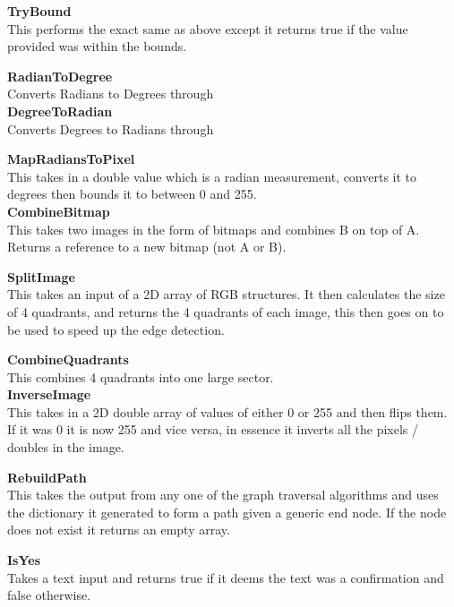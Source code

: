 \begin{FlushLeft}
    \textbf{TryBound} \\ \bk
    This performs the exact same as above except it returns true if the value provided was within the bounds.\\\bk

    \textbf{RadianToDegree} \\ \bk
    Converts Radians to Degrees through \\\bk
    \textbf{DegreeToRadian} \\ \bk
    Converts Degrees to Radians through \\\bk

    \textbf{MapRadiansToPixel} \\ \bk
    This takes in a double value which is a radian measurement, converts it to degrees then bounds it to between 0 and 255.\\\bk
    \textbf{CombineBitmap} \\ \bk
    This takes two images in the form of bitmaps and combines B on top of A. Returns a reference to a new bitmap (not A or B).\\\bk

    \textbf{SplitImage} \\ \bk
    This takes an input of a 2D array of RGB structures. It then calculates the size of 4 quadrants, and returns the 4 quadrants of each image, this then goes on to be used to speed up the edge detection.\\\bk
    
    \textbf{CombineQuadrants} \\ \bk
    This combines 4 quadrants into one large sector.\\\bk
    \textbf{InverseImage} \\ \bk
    This takes in a 2D double array of values of either 0 or 255 and then flips them. If it was 0 it is now 255 and vice versa, in essence it inverts all the pixels / doubles in the image.\\\bk

    \textbf{RebuildPath} \\ \bk
    This takes the output from any one of the graph traversal algorithms and uses the dictionary it generated to form a path given a generic end node. If the node does not exist it returns an empty array.\\\bk
    
    \textbf{IsYes} \\ \bk
    Takes a text input and returns true if it deems the text was a confirmation and false otherwise.\\\bk


\end{FlushLeft}
